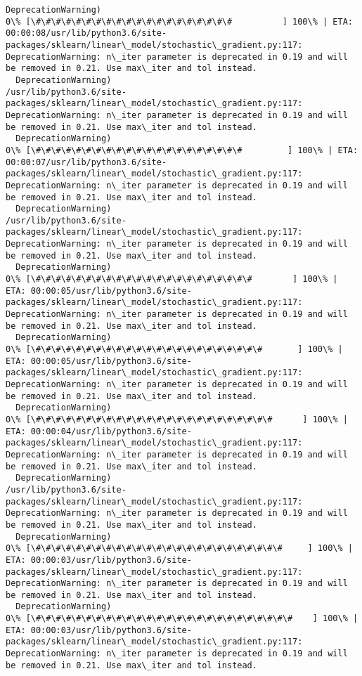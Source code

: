 \documentclass[11pt]{article}
\begin{document}
\begin{Verbatim}[commandchars=\\\{\}]
  DeprecationWarning)
0\% [\#\#\#\#\#\#\#\#\#\#\#\#\#\#\#\#\#\#\#\#          ] 100\% | ETA: 00:00:08/usr/lib/python3.6/site-packages/sklearn/linear\_model/stochastic\_gradient.py:117: DeprecationWarning: n\_iter parameter is deprecated in 0.19 and will be removed in 0.21. Use max\_iter and tol instead.
  DeprecationWarning)
/usr/lib/python3.6/site-packages/sklearn/linear\_model/stochastic\_gradient.py:117: DeprecationWarning: n\_iter parameter is deprecated in 0.19 and will be removed in 0.21. Use max\_iter and tol instead.
  DeprecationWarning)
0\% [\#\#\#\#\#\#\#\#\#\#\#\#\#\#\#\#\#\#\#\#\#         ] 100\% | ETA: 00:00:07/usr/lib/python3.6/site-packages/sklearn/linear\_model/stochastic\_gradient.py:117: DeprecationWarning: n\_iter parameter is deprecated in 0.19 and will be removed in 0.21. Use max\_iter and tol instead.
  DeprecationWarning)
/usr/lib/python3.6/site-packages/sklearn/linear\_model/stochastic\_gradient.py:117: DeprecationWarning: n\_iter parameter is deprecated in 0.19 and will be removed in 0.21. Use max\_iter and tol instead.
  DeprecationWarning)
0\% [\#\#\#\#\#\#\#\#\#\#\#\#\#\#\#\#\#\#\#\#\#\#        ] 100\% | ETA: 00:00:05/usr/lib/python3.6/site-packages/sklearn/linear\_model/stochastic\_gradient.py:117: DeprecationWarning: n\_iter parameter is deprecated in 0.19 and will be removed in 0.21. Use max\_iter and tol instead.
  DeprecationWarning)
0\% [\#\#\#\#\#\#\#\#\#\#\#\#\#\#\#\#\#\#\#\#\#\#\#       ] 100\% | ETA: 00:00:05/usr/lib/python3.6/site-packages/sklearn/linear\_model/stochastic\_gradient.py:117: DeprecationWarning: n\_iter parameter is deprecated in 0.19 and will be removed in 0.21. Use max\_iter and tol instead.
  DeprecationWarning)
0\% [\#\#\#\#\#\#\#\#\#\#\#\#\#\#\#\#\#\#\#\#\#\#\#\#      ] 100\% | ETA: 00:00:04/usr/lib/python3.6/site-packages/sklearn/linear\_model/stochastic\_gradient.py:117: DeprecationWarning: n\_iter parameter is deprecated in 0.19 and will be removed in 0.21. Use max\_iter and tol instead.
  DeprecationWarning)
/usr/lib/python3.6/site-packages/sklearn/linear\_model/stochastic\_gradient.py:117: DeprecationWarning: n\_iter parameter is deprecated in 0.19 and will be removed in 0.21. Use max\_iter and tol instead.
  DeprecationWarning)
0\% [\#\#\#\#\#\#\#\#\#\#\#\#\#\#\#\#\#\#\#\#\#\#\#\#\#     ] 100\% | ETA: 00:00:03/usr/lib/python3.6/site-packages/sklearn/linear\_model/stochastic\_gradient.py:117: DeprecationWarning: n\_iter parameter is deprecated in 0.19 and will be removed in 0.21. Use max\_iter and tol instead.
  DeprecationWarning)
0\% [\#\#\#\#\#\#\#\#\#\#\#\#\#\#\#\#\#\#\#\#\#\#\#\#\#\#    ] 100\% | ETA: 00:00:03/usr/lib/python3.6/site-packages/sklearn/linear\_model/stochastic\_gradient.py:117: DeprecationWarning: n\_iter parameter is deprecated in 0.19 and will be removed in 0.21. Use max\_iter and tol instead.

\end{Verbatim}
\end{document}
